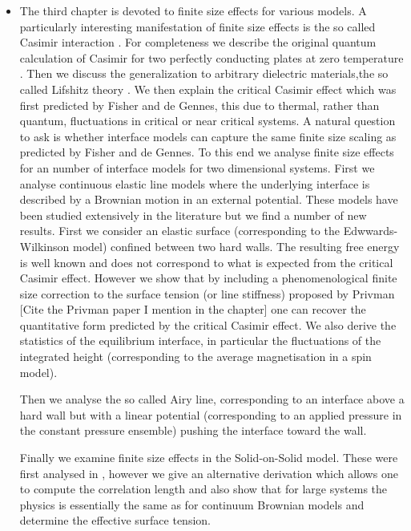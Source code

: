 \begin{itemize}
    \item The third chapter is devoted to finite size effects for various models. A particularly interesting manifestation of finite size effects is the so called Casimir interaction \cite{kimball_a_milton_casimir_2001}. For completeness we describe the original quantum calculation of Casimir for two perfectly conducting plates at zero temperature \cite{h_b_g_casimir_attraction_1948}. Then we discuss the generalization to arbitrary  dielectric materials,the so called Lifshitz theory \cite{lifshits_theory_1955}. We then explain the critical Casimir effect which was first predicted by Fisher and de Gennes, this due to thermal, rather than quantum, fluctuations in critical or near critical systems. A natural question to ask is whether interface models can capture the same finite size scaling as predicted by Fisher and de Gennes. To this end we analyse finite size effects for an number of interface models for two dimensional systems. First we analyse continuous elastic line models where the underlying interface is described by a Brownian motion in an external potential. These models have been studied extensively in the literature but we find a number of new results. First we consider an elastic surface (corresponding to the Edwwards-Wilkinson model) confined between two hard walls. The resulting free energy is well known and does not correspond to what is expected from the critical Casimir effect. However we show that by including a phenomenological finite size correction to the surface tension (or line stiffness) proposed by Privman [Cite the Privman paper I mention in the chapter] one can recover the quantitative form predicted by the critical Casimir effect. 
We also derive the statistics of the equilibrium interface, in particular the fluctuations of the integrated height (corresponding to the average magnetisation in a spin model). 

Then we analyse the so called Airy line, corresponding to an interface above a hard wall but with a linear potential (corresponding to an applied pressure in the constant pressure ensemble) pushing the interface toward the wall.

    Finally we examine finite size effects in the Solid-on-Solid model. These were first analysed in \cite{privman_finite-size_1988-1}, however we give an alternative derivation which allows one to compute the correlation length and also show that for large systems the physics is essentially the same as for continuum Brownian models and determine the effective surface tension.
    

\end{itemize}
